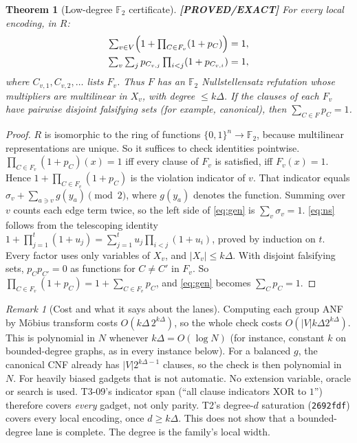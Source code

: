 \documentclass[11pt]{article}
\newtheorem{theorem}{Theorem}
\theoremstyle{definition}
\theoremstyle{remark}
\newtheorem{remark}{Remark}
\newcommand{\lab}[1]{\textbf{[#1]}}
\newcommand{\F}{\mathbb{F}}
\begin{document}
\begin{theorem}[Low-degree $\F_2$ certificate]\label{thm:anf}
\lab{PROVED/EXACT} For every local encoding, in $R$:
\begin{align}
\textstyle\sum_{v\in V}\Bigl(1+\prod_{C\in F_v}(1+p_C)\Bigr)&=1, \label{eq:gen}\\
\textstyle\sum_{v}\sum_{j}p_{C_{v,j}}\prod_{i<j}(1+p_{C_{v,i}})&=1, \label{eq:ns}
\end{align}
where $C_{v,1},C_{v,2},\dots$ lists $F_v$. Thus $F$ has an $\F_2$ Nullstellensatz refutation
whose multipliers are multilinear in $X_v$, with degree $\le k\Delta$. If the clauses of each
$F_v$ have pairwise disjoint falsifying sets (for example, canonical), then
$\sum_{C\in F}p_C=1$.
\end{theorem}
\begin{proof}
$R$ is isomorphic to the ring of functions $\{0,1\}^n\to\F_2$, because multilinear
representations are unique. So it suffices to check identities pointwise.
$\prod_{C\in F_v}(1+p_C)(x)=1$ iff every clause of $F_v$ is satisfied, iff $F_v(x)=1$. Hence
$1+\prod_{C\in F_v}(1+p_C)$ is the violation indicator of $v$. That indicator equals
$\sigma_v+\sum_{a\ni v}g(y_a)\pmod 2$, where $g(y_a)$ denotes the function. Summing over $v$
counts each edge term twice, so the left side of \eqref{eq:gen} is $\sum_v\sigma_v=1$.
\eqref{eq:ns} follows from the telescoping identity
$1+\prod_{j=1}^t(1+u_j)=\sum_{j=1}^tu_j\prod_{i<j}(1+u_i)$, proved by induction on $t$. Every
factor uses only variables of $X_v$, and $|X_v|\le k\Delta$. With disjoint falsifying sets,
$p_Cp_{C'}=0$ as functions for $C\neq C'$ in $F_v$. So
$\prod_{C\in F_v}(1+p_C)=1+\sum_{C\in F_v}p_C$, and \eqref{eq:gen} becomes
$\sum_Cp_C=1$.
\end{proof}

\begin{remark}[Cost and what it says about the lanes]
Computing each group ANF by Möbius transform costs $O(k\Delta\,2^{k\Delta})$, so the whole
check costs $O(|V|k\Delta2^{k\Delta})$. This is polynomial in $N$ whenever
$k\Delta=O(\log N)$ (for instance, constant $k$ on bounded-degree graphs, as in every
instance below). For a balanced $g$, the canonical CNF already has $|V|2^{k\Delta-1}$
clauses, so the check is then polynomial in $N$. For heavily biased gadgets that is not
automatic. No extension variable, oracle or search is used. T3-09's
indicator span (``all clause indicators XOR to $1$'') therefore covers \emph{every} gadget,
not only parity. T2's degree-$d$ saturation (\texttt{2692fdf}) covers every local encoding,
once $d\ge k\Delta$. This does not show that a bounded-degree lane is complete. The degree is
the family's local width.
\end{remark}
\end{document}
